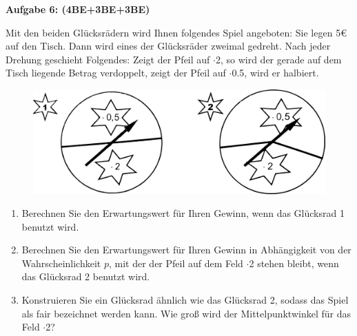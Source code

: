 \documentclass[a4paper,12pt]{article}
\newcommand{\Aufgabe}[1]{
  {
  \vspace*{0.5cm}
  \textsf{\textbf{Aufgabe #1}}
  \vspace*{0.2cm}
  
  }
}
\begin{document}
\Aufgabe{6: (4BE+3BE+3BE)} 
Mit den beiden Glücksrädern wird Ihnen folgendes Spiel angeboten: Sie legen 5€ auf den Tisch. Dann wird eines der Glücksräder zweimal gedreht. Nach jeder Drehung geschieht Folgendes: Zeigt der Pfeil auf $\cdot$2, so wird der gerade auf dem Tisch liegende Betrag verdoppelt, zeigt der Pfeil auf $\cdot$0.5, wird er halbiert.

\begin{figure}[H]
  \centering
  \includegraphics[width=0.7\columnwidth]{211203_gluecksraeder.png}
\end{figure}

\begin{enumerate}[label={\alph*)}] 
  \item Berechnen Sie den Erwartungswert für Ihren Gewinn, wenn das Glücksrad 1 benutzt wird.
  \item Berechnen Sie den Erwartungswert für Ihren Gewinn in Abhängigkeit von der Wahrscheinlichkeit $p$, mit der der Pfeil auf dem Feld $\cdot$2 stehen bleibt, wenn das Glücksrad 2 benutzt wird.
  \item Konstruieren Sie ein Glücksrad ähnlich wie das Glücksrad 2, sodass das Spiel als fair bezeichnet werden kann. Wie groß wird der Mittelpunktwinkel für das Feld $\cdot$2?
\end{enumerate}
\end{document}
